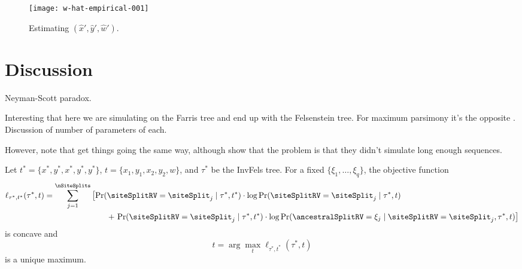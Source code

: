 \begin{figure}
\centering
\texttt{[image: w-hat-empirical-001]}
\caption{
    Estimating $(\hat{x}', \hat{y}', \hat{w}')$.
}
\label{fig:bl-general-inconsistency}
\end{figure}

\section{Discussion}

Neyman-Scott paradox.

Interesting that here we are simulating on the Farris tree and end up with the Felsenstein tree.
For maximum parsimony it's the opposite \cite{Felsenstein1978-rr}.
Discussion of number of parameters of each.

However, note that \cite{Siddall1998-hq} get things going the same way, although \cite{Swofford2001-hr} show that the problem is that they didn't simulate long enough sequences.


\begin{lemma}
\label{lem:concavity}
Let $t^*=\{x^*, y^*, x^*, y^*, y^*\}$, $t=\{x_1, y_1, x_2, y_2, w\}$, and $\tau^*$ be the InvFels tree.
For a fixed $\{\xi_1,\ldots,\xi_q\}$, the objective function
\begin{align*}
\ell_{\tau^*,t^*}(\tau^*, t) = \sum_{j=1}^\nSiteSplits &\left[\Pr(\siteSplitRV=\siteSplit_j \mid \tau^*, t^*) \cdot \log \Pr(\siteSplitRV=\siteSplit_j \mid \tau^*, t) \right.\\
&\qquad+ \left.\Pr(\siteSplitRV=\siteSplit_j \mid \tau^*, t^*) \cdot \log \Pr(\ancestralSplitRV=\xi_j \mid \siteSplitRV=\siteSplit_j , \tau^*, t)\right]
\end{align*}
is concave and
\[
\hat{t} = \arg\max_t \ell_{\tau^*, t^*}(\tau^*, t)
\]
is a unique maximum.
\end{lemma}

